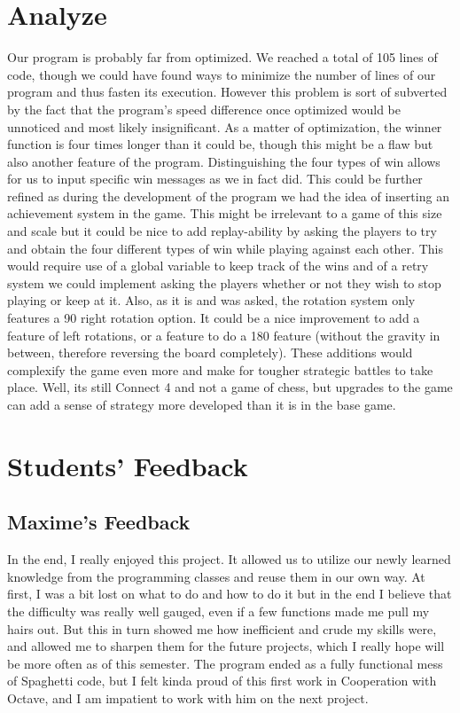 \documentclass{article}
\begin{document}
\section{Analyze}

Our program is probably far from optimized. We reached a total of 105 lines of code, though we could have found ways to minimize the number of lines of our program and thus fasten its execution. However this problem is sort of subverted by the fact that the program's speed difference once optimized would be unnoticed and most likely insignificant. As a matter of optimization, the winner function is four times longer than it could be, though this might be a flaw but also another feature of the program. Distinguishing the four types of win allows for us to input specific win messages as we in fact did. This could be further refined as during the development of the program we had the idea of inserting an achievement system in the game. This might be irrelevant to a game of this size and scale but it could be nice to add replay-ability by asking the players to try and obtain the four different types of win while playing against each other. This would require use of a global variable to keep track of the wins and of a retry system we could implement asking the players whether or not they wish to stop playing or keep at it. Also, as it is and was asked, the rotation system only features a 90 \degree right rotation option. It could be a nice improvement to add a feature of left rotations, or a feature to do a 180 \degree feature (without the gravity in between, therefore reversing the board completely). These additions would complexify the game even more and make for tougher strategic battles to take place. Well, its still Connect 4 and not a game of chess, but upgrades to the game can add a sense of strategy more developed than it is in the base game. 

\section{Students' Feedback}

\subsection{Maxime's Feedback}
In the end, I really enjoyed this project. It allowed us to utilize our newly learned knowledge from the programming classes and reuse them in our own way. At first, I was a bit lost on what to do and how to do it but in the end I believe that the difficulty was really well gauged, even if a few functions made me pull my hairs out. But this in turn showed me how inefficient and crude my skills were, and allowed me to sharpen them for the future projects, which I really hope will be more often as of this semester. The program ended as a fully functional mess of Spaghetti code, but I felt kinda proud of this first work in Cooperation with Octave, and I am impatient to work with him on the next project.   
\end{document}

